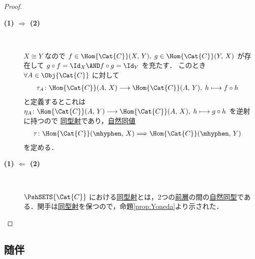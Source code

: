 \documentclass[TQFT_main]{subfiles}
\begin{document}
\begin{proof}
    \begin{description}
        \item[\textbf{(1) $\bm{\Longrightarrow}$ (2)}]　
        
        $X \cong Y$ なので $f \in \Hom{\Cat{C}} (X,\, Y),\; g \in \Hom{\Cat{C}}(Y,\, X)$ が存在して $g \circ f = \Id_X \AND f \circ g = \Id_Y$ を充たす．
        このとき $\forall A \in \Obj{\Cat{C}}$ に対して
        \begin{align}
            \tau_A \colon \Hom{\Cat{C}}(A,\, X) \lto \Hom{\Cat{C}}(A,\, Y),\; h \lmto f \circ h
        \end{align}
        と定義するとこれは $\eta_A \colon \Hom{\Cat{C}}(A,\, Y) \lto \Hom{\Cat{C}}(A,\, X),\; h \lmto g \circ h$ を逆射に持つので
        \hyperref[def:iso]{同型射}であり，\hyperref[def:nat]{自然同値}
        \begin{align}
            \tau \colon \Hom{\Cat{C}} (\mhyphen,\, X) \Longrightarrow \Hom{\Cat{C}} (\mhyphen,\, Y)
        \end{align}
        を定める．

        \item[\textbf{(1) $\bm{\Longleftarrow}$ (2)}]　
        
        $\PshSETS{\Cat{C}}$ における\hyperref[def:iso]{同型射}とは，2つの\hyperref[def:presheaf-general]{前層}の間の\hyperref[def:nat]{自然同型}である．関手は\hyperref[def:iso]{同型射}を保つので，命題\ref{prop:Yoneda}より示された．
    \end{description}
    
\end{proof}




\subsection{随伴}
\end{document}
